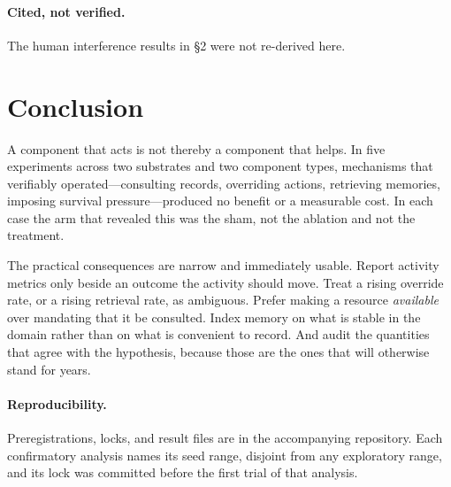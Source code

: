 \documentclass[11pt]{article}
\begin{document}
\paragraph{Cited, not verified.} The human interference results in \S2 were not
re-derived here.

\section{Conclusion}

A component that acts is not thereby a component that helps. In five
experiments across two substrates and two component types, mechanisms that
verifiably operated---consulting records, overriding actions, retrieving
memories, imposing survival pressure---produced no benefit or a measurable
cost. In each case the arm that revealed this was the sham, not the ablation
and not the treatment.

The practical consequences are narrow and immediately usable. Report activity
metrics only beside an outcome the activity should move. Treat a rising
override rate, or a rising retrieval rate, as ambiguous. Prefer making a
resource \emph{available} over mandating that it be consulted. Index memory on
what is stable in the domain rather than on what is convenient to record. And
audit the quantities that agree with the hypothesis, because those are the ones
that will otherwise stand for years.

\paragraph{Reproducibility.} Preregistrations, locks, and result files are in
the accompanying repository. Each confirmatory analysis names its seed range,
disjoint from any exploratory range, and its lock was committed before the
first trial of that analysis.
\end{document}
